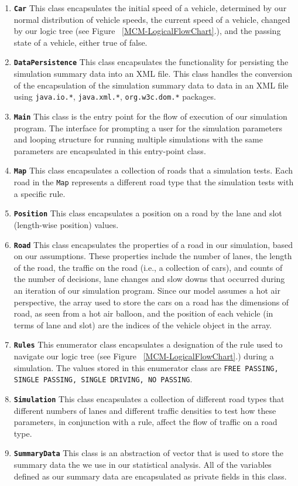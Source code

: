 \documentclass{amsart}
\begin{document}
		\begin{enumerate}
			\item{\textbf{\texttt{Car}}
				This class encapsulates the initial speed of a vehicle, determined by our normal distribution of vehicle speeds, the current speed of a vehicle, changed by our logic tree (see Figure ~\ref{MCM-LogicalFlowChart}.), and the passing state of a vehicle, either true of false. 
			}
			\item{\textbf{\texttt{DataPersistence}}
				This class encapsulates the functionality for persisting the simulation summary data into an XML file. This class handles the conversion of the encapsulation of the simulation summary data to data in an XML file using \texttt{java.io.*}, \texttt{java.xml.*}, \texttt{org.w3c.dom.*} packages.
			}
			\item{\textbf{\texttt{Main}}
				This class is the entry point for the flow of execution of our simulation program. The interface for prompting a user for the simulation parameters and looping structure for running multiple simulations with the same parameters are encapsulated in this entry-point class.
			}
			\item{\textbf{\texttt{Map}}
				This class encapsulates a collection of roads that a simulation tests. Each road in the \texttt{Map} represents a different road type that the simulation tests with a specific rule.
			}
			\item{\textbf{\texttt{Position}}
				This class encapsulates a position on a road by the lane and slot (length-wise position) values.
			}
			\item{\textbf{\texttt{Road}}
				This class encapsulates the properties of a road in our simulation, based on our assumptions. These properties include the number of lanes, the length of the road, the traffic on the road (i.e., a collection of cars), and counts of the number of decisions, lane changes and slow downs that occurred during an iteration of our simulation program. Since our model assumes a hot air perspective, the array used to store the cars on a road has the dimensions of road, as seen from a hot air balloon, and the position of each vehicle (in terms of lane and slot) are the indices of the vehicle object in the array.
			}
			\item{\textbf{\texttt{Rules}}
				This enumerator class encapsulates a designation of the rule used to navigate our logic tree (see Figure ~\ref{MCM-LogicalFlowChart}.) during a simulation. The values stored in this enumerator class are \texttt{FREE PASSING, SINGLE PASSING, SINGLE DRIVING, NO PASSING}.
			}
			\item{\textbf{\texttt{Simulation}}
				This class encapsulates a collection of different road types that different numbers of lanes and different traffic densities to test how these parameters, in conjunction with a rule, affect the flow of traffic on a road type.
			}
			\item{\textbf{\texttt{SummaryData}}
				This class is an abstraction of vector that is used to store the summary data the we use in our statistical analysis. All of the variables defined as our summary data are encapsulated as private fields in this class.
			}
		\end{enumerate}
\end{document}
